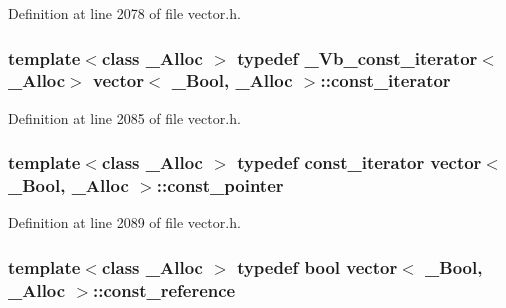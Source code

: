 Definition at line 2078 of file vector.\+h.

\hypertarget{classvector_3_01___bool_00_01___alloc_01_4_a79966c86fbbd4dcb38b01eb352633b7e}{
\subsubsection[{const\+\_\+iterator}]{\setlength{\rightskip}{0pt plus 5cm}template$<$class \+\_\+\+Alloc $>$ typedef {\bf \+\_\+\+Vb\+\_\+const\+\_\+iterator}$<$\+\_\+\+Alloc$>$ {\bf vector}$<$ \+\_\+\+Bool, \+\_\+\+Alloc $>$\+::{\bf const\+\_\+iterator}}}\label{classvector_3_01___bool_00_01___alloc_01_4_a79966c86fbbd4dcb38b01eb352633b7e}


Definition at line 2085 of file vector.\+h.

\hypertarget{classvector_3_01___bool_00_01___alloc_01_4_a37c69754c68d037af4ff810352cfefe7}{
\subsubsection[{const\+\_\+pointer}]{\setlength{\rightskip}{0pt plus 5cm}template$<$class \+\_\+\+Alloc $>$ typedef {\bf const\+\_\+iterator} {\bf vector}$<$ \+\_\+\+Bool, \+\_\+\+Alloc $>$\+::{\bf const\+\_\+pointer}}}\label{classvector_3_01___bool_00_01___alloc_01_4_a37c69754c68d037af4ff810352cfefe7}


Definition at line 2089 of file vector.\+h.

\hypertarget{classvector_3_01___bool_00_01___alloc_01_4_ab8b5b0a3cc432065c3a9083e11014298}{
\subsubsection[{const\+\_\+reference}]{\setlength{\rightskip}{0pt plus 5cm}template$<$class \+\_\+\+Alloc $>$ typedef bool {\bf vector}$<$ \+\_\+\+Bool, \+\_\+\+Alloc $>$\+::{\bf const\+\_\+reference}}}\label{classvector_3_01___bool_00_01___alloc_01_4_ab8b5b0a3cc432065c3a9083e11014298}


